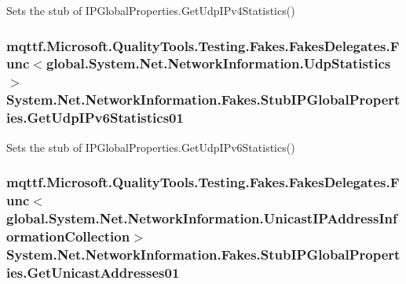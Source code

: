Sets the stub of I\-P\-Global\-Properties.\-Get\-Udp\-I\-Pv4\-Statistics()

\hypertarget{class_system_1_1_net_1_1_network_information_1_1_fakes_1_1_stub_i_p_global_properties_aa6881fce3c8f8eff629c3ac4bfe763c4}{
\subsubsection[{Get\-Udp\-I\-Pv6\-Statistics01}]{\setlength{\rightskip}{0pt plus 5cm}mqttf.\-Microsoft.\-Quality\-Tools.\-Testing.\-Fakes.\-Fakes\-Delegates.\-Func$<$global.\-System.\-Net.\-Network\-Information.\-Udp\-Statistics$>$ System.\-Net.\-Network\-Information.\-Fakes.\-Stub\-I\-P\-Global\-Properties.\-Get\-Udp\-I\-Pv6\-Statistics01}}\label{class_system_1_1_net_1_1_network_information_1_1_fakes_1_1_stub_i_p_global_properties_aa6881fce3c8f8eff629c3ac4bfe763c4}


Sets the stub of I\-P\-Global\-Properties.\-Get\-Udp\-I\-Pv6\-Statistics()

\hypertarget{class_system_1_1_net_1_1_network_information_1_1_fakes_1_1_stub_i_p_global_properties_a0a10406a0b3743f411925b028167a593}{
\subsubsection[{Get\-Unicast\-Addresses01}]{\setlength{\rightskip}{0pt plus 5cm}mqttf.\-Microsoft.\-Quality\-Tools.\-Testing.\-Fakes.\-Fakes\-Delegates.\-Func$<$global.\-System.\-Net.\-Network\-Information.\-Unicast\-I\-P\-Address\-Information\-Collection$>$ System.\-Net.\-Network\-Information.\-Fakes.\-Stub\-I\-P\-Global\-Properties.\-Get\-Unicast\-Addresses01}}\label{class_system_1_1_net_1_1_network_information_1_1_fakes_1_1_stub_i_p_global_properties_a0a10406a0b3743f411925b028167a593}


